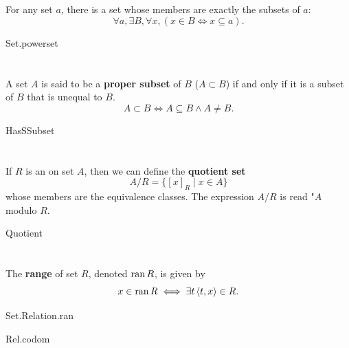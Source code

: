 \documentclass{report}
\begin{document}
\section{}%

  For any set $a$, there is a set whose members are exactly the subsets of $a$:
    $$\forall a, \exists B, \forall x, (x \in B \iff x \subseteq a).$$

    {Set.powerset}

\section{}%

  A set $A$ is said to be a \textbf{proper subset} of $B$ ($A \subset B$) if and
    only if it is a subset of $B$ that is unequal to $B$.
  $$A \subset B \iff A \subseteq B \land A \neq B.$$

    {HasSSubset}

\section{}%

  If $R$ is an  on set $A$, then we can define
    the \textbf{quotient set} $$A / R = \{[x]_R \mid x \in A\}$$ whose members
    are the equivalence classes.
  The expression $A / R$ is read "$A$ modulo $R$.

    {Quotient}

\section{}%

  The \textbf{range} of set $R$, denoted $\mathop{\text{ran}}{R}$, is given by
    $$x \in \mathop{\text{ran}}{R} \iff \exists t \left< t, x \right> \in R.$$

    {Set.Relation.ran}

    {Rel.codom}

\section{}%
\end{document}
